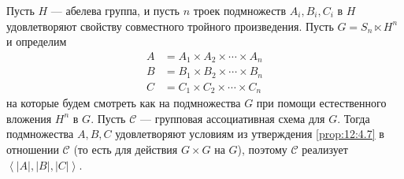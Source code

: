 \begin{theorem}\label{th:12:6.3} 
  Пусть $H$ --- абелева группа, и пусть $n$ троек подмножеств $A_i, B_i, C_i$ в $H$ удовлетворяют свойству совместного тройного произведения. Пусть $G = S_n \ltimes H^n$ и определим
  \begin{align*}
    A & = A_1 \times A_2 \times \dotsm \times A_n \\
    B & = B_1 \times B_2 \times \dotsm \times B_n \\
    C & = C_1 \times C_2 \times \dotsm \times C_n   
  \end{align*}
  на которые будем смотреть как на подмножества $G$ при помощи естественного вложения $H^n$ в $G$. Пусть $\mathscr{C}$ --- групповая ассоциативная схема для $G$. Тогда подмножества $A,B,C$ удовлетворяют условиям из утверждения \ref{prop:12:4.7} в отношении $\mathscr{C}$ (то есть для действия $G \times G$ на $G$), поэтому $\mathscr{C}$ реализует $\left\langle |A|, |B|, |C| \right\rangle$.
\end{theorem}
